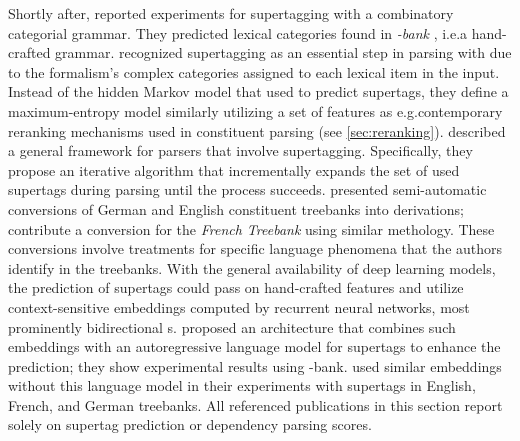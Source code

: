 \documentclass[../document.tex]{subfiles}
\begin{document}
    Shortly after, \citet{clark2002supertagging} reported experiments for supertagging with a combinatory categorial grammar.
    They predicted lexical categories found in \emph{-bank} \citep{Hoc07}, i.e.\@ a hand-crafted grammar.   
    \citet{Clark04} recognized supertagging as an essential step in parsing with  due to the formalism's complex categories assigned to each lexical item in the input.
    Instead of the hidden Markov model that \citet{bangalore1999supertagging} used to predict supertags, they define a maximum-entropy model similarly utilizing a set of features as e.g.\@ contemporary reranking mechanisms used in constituent parsing (see \cref{sec:reranking}).
    \citet{Auli12} described a general framework for parsers that involve supertagging.
    Specifically, they propose an iterative algorithm that incrementally expands the set of used supertags during parsing until the process succeeds.
    \citet{kaeshammer2012german,Kaeshammer2012GermanAE} presented semi-automatic conversions of German and English constituent treebanks into  derivations; \citet{Bla18} contribute a conversion for the \emph{French Treebank} \citep{abeille2003building} using similar methology.
    These conversions involve treatments for specific language phenomena that the authors identify in the treebanks.
    With the general availability of deep learning models, the prediction of supertags could pass on hand-crafted features and utilize context-sensitive embeddings computed by recurrent neural networks, most prominently bidirectional s.
    \citet{vaswani2016supertagging} proposed an architecture that combines such embeddings with an autoregressive language model for supertags to enhance the prediction; they show experimental results using -bank.
    \citet{Kas17,Bla18} used similar embeddings without this language model in their experiments with  supertags in English, French, and German treebanks.
    All referenced publications in this section report solely on supertag prediction or dependency parsing scores.

    \ifSubfilesClassLoaded{%
        \printindex
    }{}
\end{document}
